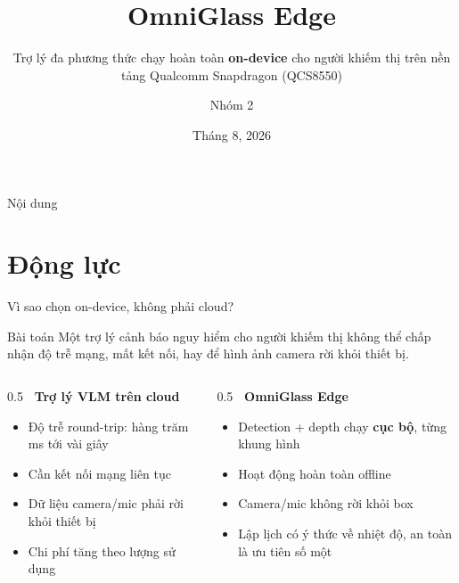 \documentclass[aspectratio=169]{beamer}
\title{OmniGlass Edge}
\subtitle{\small Trợ lý đa phương thức chạy hoàn toàn \textbf{on-device} cho người khiếm thị trên nền tảng Qualcomm Snapdragon (QCS8550)}
\author{Nhóm 2}
\institute{\small Khoa Công nghệ Thông tin -- Trường Đại học Khoa học Tự nhiên, ĐHQG-HCM}
\date{Tháng 8, 2026}
\begin{document}
\begin{frame}
  \titlepage
\end{frame}

\begin{frame}{Nội dung}
  \tableofcontents
\end{frame}

\section{Động lực}

\begin{frame}{Vì sao chọn on-device, không phải cloud?}
  \begin{block}{Bài toán}
    Một trợ lý cảnh báo nguy hiểm cho người khiếm thị không thể chấp nhận độ trễ
    mạng, mất kết nối, hay để hình ảnh camera rời khỏi thiết bị.
  \end{block}
  \vspace{4pt}
  \begin{columns}[T]
    \begin{column}{0.5\textwidth}
      \textbf{\faCloud\ Trợ lý VLM trên cloud}
      \begin{itemize}
        \item Độ trễ round-trip: hàng trăm ms tới vài giây
        \item Cần kết nối mạng liên tục
        \item Dữ liệu camera/mic phải rời khỏi thiết bị
        \item Chi phí tăng theo lượng sử dụng
      \end{itemize}
    \end{column}
    \begin{column}{0.5\textwidth}
      \textbf{\faMicrochip\ OmniGlass Edge}
      \begin{itemize}
        \item Detection + depth chạy \textbf{cục bộ}, từng khung hình
        \item Hoạt động hoàn toàn offline
        \item Camera/mic không rời khỏi box
        \item Lập lịch có ý thức về nhiệt độ, an toàn là ưu tiên số một
      \end{itemize}
    \end{column}
  \end{columns}
\end{frame}
\end{document}
